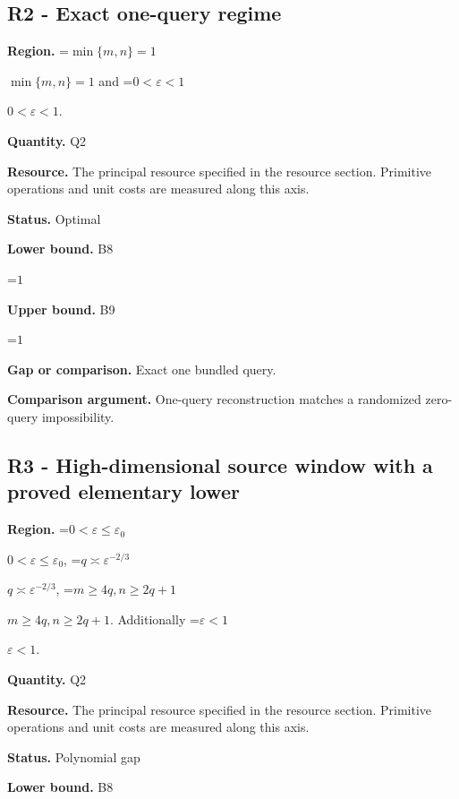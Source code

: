 \documentclass[10pt,a4paper]{article}
\newcommand{\AtlasMath}[1]{\par\begingroup\centering\setbox0=\hbox{$\displaystyle #1$}\ifdim\wd0>1.4\linewidth\typeout{ATLAS WIDE FORMULA: \the\wd0}\fi\ifdim\wd0>\linewidth\resizebox{\linewidth}{!}{\box0}\else\box0\fi\par\endgroup}
\newcommand{\AtlasInlineMath}[1]{\begingroup\setbox0=\hbox{$#1$}\ifdim\wd0>.4\linewidth\endgroup\AtlasMath{#1}\else\endgroup$#1$\fi}
\begin{document}
\subsection{R2 - Exact one-query regime}


\textbf{Region.} \AtlasInlineMath{\min\{m,n\}=1} and \AtlasInlineMath{0<\varepsilon<1}.



\textbf{Quantity.} Q2



\textbf{Resource.} The principal resource specified in the resource section. Primitive operations and unit costs are measured along this axis.



\textbf{Status.} Optimal



\textbf{Lower bound.} B8



\AtlasMath{1}


\textbf{Upper bound.} B9



\AtlasMath{1}


\textbf{Gap or comparison.} Exact one bundled query.



\textbf{Comparison argument.} One-query reconstruction matches a randomized zero-query impossibility.



\subsection{R3 - High-dimensional source window with a proved elementary lower}


\textbf{Region.} \AtlasInlineMath{0<\varepsilon\le\varepsilon_0}, \AtlasInlineMath{q\asymp\varepsilon^{-2/3}}, \AtlasInlineMath{m\ge4q,n\ge2q+1}. Additionally \AtlasInlineMath{\varepsilon<1}.



\textbf{Quantity.} Q2



\textbf{Resource.} The principal resource specified in the resource section. Primitive operations and unit costs are measured along this axis.



\textbf{Status.} Polynomial gap



\textbf{Lower bound.} B8
\end{document}
